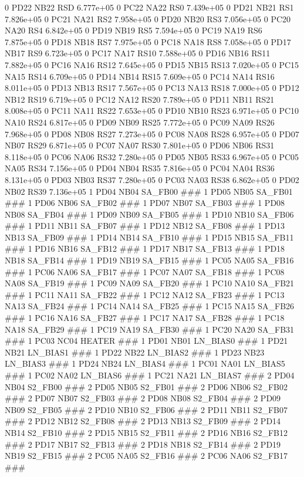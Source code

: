 0 PD22 NB22 RSD 6.777e+05 
0 PC22 NA22 RS0 7.439e+05 
0 PD21 NB21 RS1 7.826e+05 
0 PC21 NA21 RS2 7.958e+05 
0 PD20 NB20 RS3 7.056e+05 
0 PC20 NA20 RS4 6.842e+05 
0 PD19 NB19 RS5 7.594e+05 
0 PC19 NA19 RS6 7.875e+05 
0 PD18 NB18 RS7 7.975e+05 
0 PC18 NA18 RS8 7.058e+05 
0 PD17 NB17 RS9 6.723e+05 
0 PC17 NA17 RS10 7.588e+05 
0 PD16 NB16 RS11 7.882e+05 
0 PC16 NA16 RS12 7.645e+05 
0 PD15 NB15 RS13 7.020e+05 
0 PC15 NA15 RS14 6.709e+05 
0 PD14 NB14 RS15 7.609e+05 
0 PC14 NA14 RS16 8.011e+05 
0 PD13 NB13 RS17 7.567e+05 
0 PC13 NA13 RS18 7.000e+05 
0 PD12 NB12 RS19 6.719e+05 
0 PC12 NA12 RS20 7.789e+05 
0 PD11 NB11 RS21 8.008e+05 
0 PC11 NA11 RS22 7.653e+05 
0 PD10 NB10 RS23 6.971e+05 
0 PC10 NA10 RS24 6.817e+05 
0 PD09 NB09 RS25 7.772e+05 
0 PC09 NA09 RS26 7.968e+05 
0 PD08 NB08 RS27 7.273e+05 
0 PC08 NA08 RS28 6.957e+05 
0 PD07 NB07 RS29 6.871e+05 
0 PC07 NA07 RS30 7.801e+05 
0 PD06 NB06 RS31 8.118e+05 
0 PC06 NA06 RS32 7.280e+05 
0 PD05 NB05 RS33 6.967e+05 
0 PC05 NA05 RS34 7.156e+05 
0 PD04 NB04 RS35 7.816e+05 
0 PC04 NA04 RS36 8.131e+05 
0 PD03 NB03 RS37 7.280e+05 
0 PC03 NA03 RS38 6.862e+05 
0 PD02 NB02 RS39 7.136e+05 
1 PD04 NB04 SA_FB00 ### 
1 PD05 NB05 SA_FB01 ### 
1 PD06 NB06 SA_FB02 ### 
1 PD07 NB07 SA_FB03 ### 
1 PD08 NB08 SA_FB04 ### 
1 PD09 NB09 SA_FB05 ### 
1 PD10 NB10 SA_FB06 ### 
1 PD11 NB11 SA_FB07 ### 
1 PD12 NB12 SA_FB08 ### 
1 PD13 NB13 SA_FB09 ### 
1 PD14 NB14 SA_FB10 ### 
1 PD15 NB15 SA_FB11 ### 
1 PD16 NB16 SA_FB12 ### 
1 PD17 NB17 SA_FB13 ### 
1 PD18 NB18 SA_FB14 ### 
1 PD19 NB19 SA_FB15 ### 
1 PC05 NA05 SA_FB16 ### 
1 PC06 NA06 SA_FB17 ### 
1 PC07 NA07 SA_FB18 ### 
1 PC08 NA08 SA_FB19 ### 
1 PC09 NA09 SA_FB20 ### 
1 PC10 NA10 SA_FB21 ### 
1 PC11 NA11 SA_FB22 ### 
1 PC12 NA12 SA_FB23 ### 
1 PC13 NA13 SA_FB24 ### 
1 PC14 NA14 SA_FB25 ### 
1 PC15 NA15 SA_FB26 ### 
1 PC16 NA16 SA_FB27 ### 
1 PC17 NA17 SA_FB28 ### 
1 PC18 NA18 SA_FB29 ### 
1 PC19 NA19 SA_FB30 ### 
1 PC20 NA20 SA_FB31 ### 
1 PC03 NC04 HEATER ### 
1 PD01 NB01 LN_BIAS0 ### 
1 PD21 NB21 LN_BIAS1 ### 
1 PD22 NB22 LN_BIAS2 ### 
1 PD23 NB23 LN_BIAS3 ### 
1 PD24 NB24 LN_BIAS4 ### 
1 PC01 NA01 LN_BIAS5 ### 
1 PC02 NA02 LN_BIAS6 ### 
1 PC21 NA21 LN_BIAS7 ### 
2 PD04 NB04 S2_FB00 ### 
2 PD05 NB05 S2_FB01 ### 
2 PD06 NB06 S2_FB02 ### 
2 PD07 NB07 S2_FB03 ### 
2 PD08 NB08 S2_FB04 ### 
2 PD09 NB09 S2_FB05 ### 
2 PD10 NB10 S2_FB06 ### 
2 PD11 NB11 S2_FB07 ### 
2 PD12 NB12 S2_FB08 ### 
2 PD13 NB13 S2_FB09 ### 
2 PD14 NB14 S2_FB10 ### 
2 PD15 NB15 S2_FB11 ### 
2 PD16 NB16 S2_FB12 ### 
2 PD17 NB17 S2_FB13 ### 
2 PD18 NB18 S2_FB14 ### 
2 PD19 NB19 S2_FB15 ### 
2 PC05 NA05 S2_FB16 ### 
2 PC06 NA06 S2_FB17 ### 
